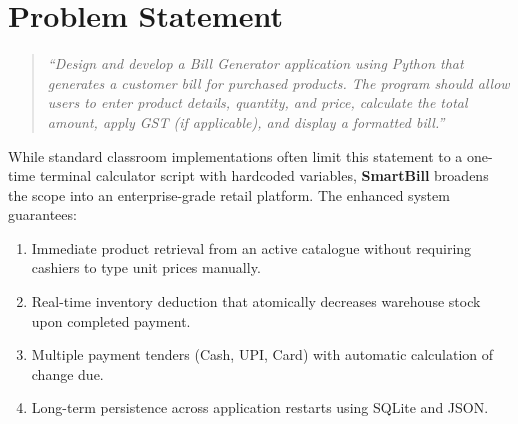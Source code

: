 \documentclass[12pt,a4paper]{article}
\begin{document}
\section{Problem Statement}
\begin{quote}
\textit{``Design and develop a Bill Generator application using Python that generates a customer bill for purchased products. The program should allow users to enter product details, quantity, and price, calculate the total amount, apply GST (if applicable), and display a formatted bill.''}
\end{quote}

While standard classroom implementations often limit this statement to a one-time terminal calculator script with hardcoded variables, \textbf{SmartBill} broadens the scope into an enterprise-grade retail platform. The enhanced system guarantees:
\begin{enumerate}
    \item Immediate product retrieval from an active catalogue without requiring cashiers to type unit prices manually.
    \item Real-time inventory deduction that atomically decreases warehouse stock upon completed payment.
    \item Multiple payment tenders (Cash, UPI, Card) with automatic calculation of change due.
    \item Long-term persistence across application restarts using SQLite and JSON.
\end{enumerate}

\end{document}
